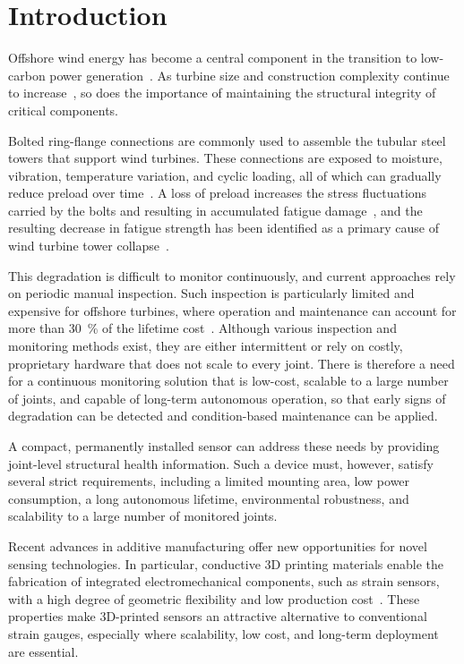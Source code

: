 \chapter{Introduction} \label{sec:Introduction}
Offshore wind energy has become a central component in the transition to low-carbon power generation~\cite{Wen_role_of_offshore_wind}. As turbine size and construction complexity continue to increase~\cite{McCoy2024OW}, so does the importance of maintaining the structural integrity of critical components.

Bolted ring-flange connections are commonly used to assemble the tubular steel towers that support wind turbines. These connections are exposed to moisture, vibration, temperature variation, and cyclic loading, all of which can gradually reduce preload over time~\cite{imperfections_review}. A loss of preload increases the stress fluctuations carried by the bolts and resulting in accumulated fatigue damage~\cite{Effects_of_preload_deficiency}, and the resulting decrease in fatigue strength has been identified as a primary cause of wind turbine tower collapse~\cite{fatigue_assessment}.
 
This degradation is difficult to monitor continuously, and current approaches rely on periodic manual inspection. Such inspection is particularly limited and expensive for offshore turbines, where operation and maintenance can account for more than \SI{30}{\percent} of the lifetime cost~\cite{zhang_fowt_inspection_2024}. Although various inspection and monitoring methods exist, they are either intermittent or rely on costly, proprietary hardware that does not scale to every joint. There is therefore a need for a continuous monitoring solution that is low-cost, scalable to a large number of joints, and capable of long-term autonomous operation, so that early signs of degradation can be detected and condition-based maintenance can be applied.
 
A compact, permanently installed sensor can address these needs by providing joint-level structural health information. Such a device must, however, satisfy several strict requirements, including a limited mounting area, low power consumption, a long autonomous lifetime, environmental robustness, and scalability to a large number of monitored joints.

Recent advances in additive manufacturing offer new opportunities for novel sensing technologies. In particular, conductive 3D printing materials enable the fabrication of integrated electromechanical components, such as strain sensors, with a high degree of geometric flexibility and low production cost~\cite{G.O.A.T}. These properties make 3D-printed sensors an attractive alternative to conventional strain gauges, especially where scalability, low cost, and long-term deployment are essential.
 
